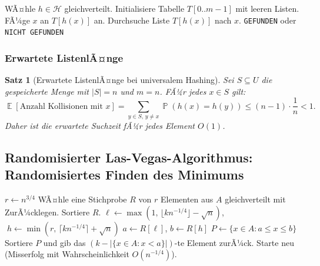 ﻿\documentclass[12pt,a4paper]{article}
\theoremstyle{definition}
\theoremstyle{plain}
\newtheorem{satz}{Satz}[section]
\theoremstyle{remark}
\DeclareMathOperator{\E}{\mathbb{E}}
\DeclareMathOperator{\Prob}{\mathbb{P}}
\begin{document}
\begin{algorithm}[H]
  \caption{Randomisiertes Hashing (Chaining)}
  \label{alg:hashing}
  \begin{algorithmic}[1]
    \State WÃ¤hle $h \in \mathcal{H}$ gleichverteilt.
    \State Initialisiere Tabelle $T[0..m-1]$ mit leeren Listen.
    \Statex
      \State FÃ¼ge $x$ an $T[h(x)]$ an.
    \EndFunction
    \Statex
      \State Durchsuche Liste $T[h(x)]$ nach $x$.
      \State \Return \texttt{GEFUNDEN} oder \texttt{NICHT GEFUNDEN}
    \EndFunction
  \end{algorithmic}
\end{algorithm}

\subsubsection{Erwartete ListenlÃ¤nge}

\begin{satz}[Erwartete ListenlÃ¤nge bei universalem Hashing]\label{satz:hashew}
  Sei $S \subseteq U$ die gespeicherte Menge mit $|S| = n$ und $m = n$.
  FÃ¼r jedes $x \in S$ gilt:
  \[
    \E\!\left[\text{Anzahl Kollisionen mit }x\right]
    = \sum_{y \in S,\, y \neq x} \Prob(h(x) = h(y))
    \leq (n-1) \cdot \frac{1}{n} < 1.
  \]
  Daher ist die erwartete Suchzeit fÃ¼r jedes Element $O(1)$.
\end{satz}

\subsection{Randomisierter Las-Vegas-Algorithmus: Randomisiertes Finden des Minimums}
\label{subsec:randmin}

\begin{algorithm}[H]
  \caption{Randomisiertes Minimum-Finden (LazySelect)}
  \label{alg:lazyselect}
  \begin{algorithmic}[1]
    \State $r \gets n^{3/4}$
    \State WÃ¤hle eine Stichprobe $R$ von $r$ Elementen aus $A$ gleichverteilt
           mit ZurÃ¼cklegen.
    \State Sortiere $R$.
    \State $\ell \gets \max\!\left(1,\, \lfloor kn^{-1/4} \rfloor - \sqrt{n}\right)$,
           $\;h \gets \min\!\left(r,\, \lceil kn^{-1/4} \rceil + \sqrt{n}\right)$
    \State $a \gets R[\ell]$, $b \gets R[h]$
    \State $P \gets \{x \in A : a \leq x \leq b\}$
      \State Sortiere $P$ und gib das $(k - |\{x \in A : x < a\}|)$-te Element zurÃ¼ck.
    \Else
      \State Starte neu (Misserfolg mit Wahrscheinlichkeit $O(n^{-1/4})$).
    \EndIf
  \end{algorithmic}
\end{algorithm}
\end{document}

